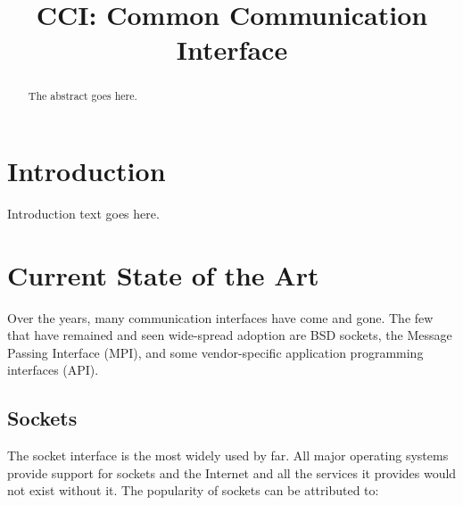 \documentclass[conference]{IEEEtran}
\begin{document}
%
\title{CCI: Common Communication Interface}
% 
\author{
}

\maketitle

\begin{abstract}
The abstract goes here.

\end{abstract}


\IEEEpeerreviewmaketitle

\newcommand{\note}[1]{\colorbox{yellow!50}{Note: #1}}

\newcommand{\f}[1]{\texttt{#1{\kern-2pt}()}}

\section{Introduction}
Introduction text goes here.

\section{Current State of the Art}
Over the years, many communication interfaces have come and gone. The few that have
remained and seen wide-spread adoption are BSD sockets\cite{bsd}, the Message Passing
Interface (MPI)\cite{mpi}, and some vendor-specific application programming interfaces
(API).

\subsection{Sockets} The socket interface is the most widely used by far. All major
operating systems provide support for sockets and the Internet and all the services it
provides would not exist without it. The popularity of sockets can be attributed to:
\end{document}
